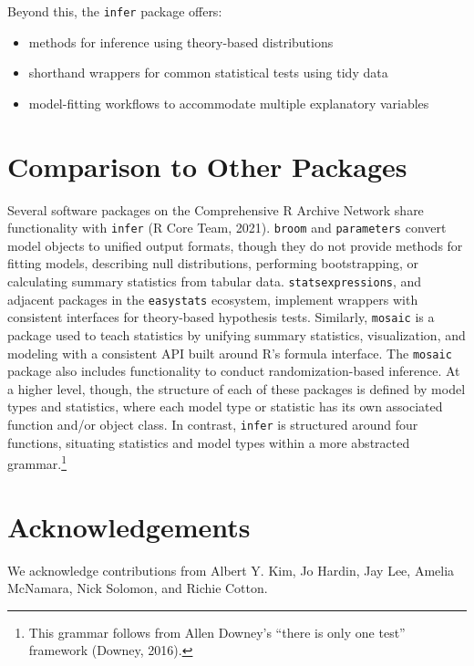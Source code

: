 \documentclass[10pt,a4paper,onecolumn]{article}
\providecommand{\tightlist}{%
  \setlength{\itemsep}{0pt}\setlength{\parskip}{0pt}}
\begin{document}
Beyond this, the \texttt{infer} package offers:

\begin{itemize}
\tightlist
\item
  methods for inference using theory-based distributions
\item
  shorthand wrappers for common statistical tests using tidy data
\item
  model-fitting workflows to accommodate multiple explanatory variables
\end{itemize}

\hypertarget{comparison-to-other-packages}{%
\section{Comparison to Other
Packages}\label{comparison-to-other-packages}}

Several software packages on the Comprehensive R Archive Network share
functionality with \texttt{infer} (R Core Team, 2021). \texttt{broom}
and \texttt{parameters} convert model objects to unified output formats,
though they do not provide methods for fitting models, describing null
distributions, performing bootstrapping, or calculating summary
statistics from tabular data. \texttt{statsexpressions}, and adjacent
packages in the \texttt{easystats} ecosystem, implement wrappers with
consistent interfaces for theory-based hypothesis tests. Similarly,
\texttt{mosaic} is a package used to teach statistics by unifying
summary statistics, visualization, and modeling with a consistent API
built around R's formula interface. The \texttt{mosaic} package also
includes functionality to conduct randomization-based inference. At a
higher level, though, the structure of each of these packages is defined
by model types and statistics, where each model type or statistic has
its own associated function and/or object class. In contrast,
\texttt{infer} is structured around four functions, situating statistics
and model types within a more abstracted grammar.\footnote{This grammar
  follows from Allen Downey's ``there is only one test'' framework
  (Downey, 2016).}

\hypertarget{acknowledgements}{%
\section{Acknowledgements}\label{acknowledgements}}

We acknowledge contributions from Albert Y. Kim, Jo Hardin, Jay Lee,
Amelia McNamara, Nick Solomon, and Richie Cotton.
\end{document}
